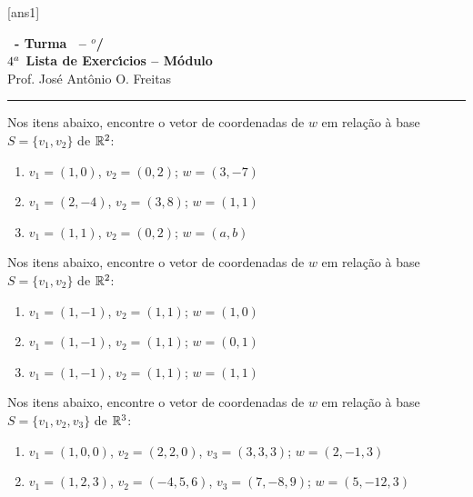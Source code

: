 \documentclass[12pt]{exam}
\begin{document}
    [ans1]
    
    \begin{center}
        {\Large\bf \disciplina\ - Turma \turma\ -- \semestre$^{o}$/\ano} \\ \vspace{9pt} {\large\bf
            $4^a$ Lista de Exerc{\'\i}cios -- Módulo \numeromodulo}\\ \vspace{9pt} Prof. Jos{\'e} Ant{\^o}nio O. Freitas
    \end{center}
    
    \hrule

    \begin{exercicio}
        Nos itens abaixo, encontre o vetor de coordenadas de $w$ em relação à base  $S = \{v_1, v_2\}$ de $\mathbb{R}^2$:
        \begin{enumerate}[label={\alph*})]
            \item $v_1 = (1, 0)$, $v_2 = (0, 2)$; $w = (3, -7)$
            \item $v_1 = (2, -4)$, $v_2 = (3, 8)$; $w = (1, 1)$
            \item $v_1 = (1, 1)$, $v_2 = (0, 2)$; $w = (a, b)$
        \end{enumerate}
    \end{exercicio}

    \begin{exercicio}
        Nos itens abaixo, encontre o vetor de coordenadas de $w$ em relação à base $S = \{v_1, v_2\}$ de $\mathbb{R}^2$:
        \begin{enumerate}[label={\alph*})]
            \item $v_1 = (1, -1)$, $v_2 = (1, 1)$; $w = (1, 0)$
            \item $v_1 = (1, -1)$, $v_2 = (1, 1)$; $w = (0, 1)$
            \item $v_1 = (1, -1)$, $v_2 = (1, 1)$; $w = (1, 1)$
        \end{enumerate}
    \end{exercicio}

    \begin{exercicio}
        Nos itens abaixo, encontre o vetor de coordenadas de $w$ em relação à base $S = \{v_1, v_2, v_3\}$ de $\mathbb{R}^3$:
        \begin{enumerate}[label={\alph*})]
            \item $v_1 = (1, 0, 0)$, $v_2 = (2, 2, 0)$, $v_3 = (3, 3, 3)$; $w = (2, -1, 3)$
            \item $v_1 = (1, 2, 3)$, $v_2 = (-4, 5, 6)$, $v_3 = (7, -8, 9)$; $w = (5, -12, 3)$
        \end{enumerate}
    \end{exercicio}
\end{document}
